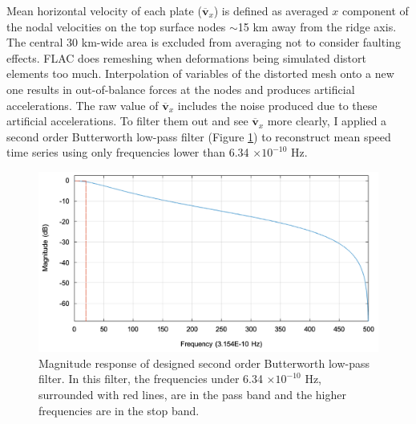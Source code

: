 \documentclass[letterpaper,12pt,notitle]{memphisthesis}                     %
\begin{document}
Mean horizontal velocity of each plate ($\overline{\boldsymbol{v}}_{x}$) is defined as averaged $x$ component of the nodal velocities on the top surface nodes $\sim$15 km away from the ridge axis. The central 30 km-wide area is excluded from averaging not to consider faulting effects. 
FLAC does remeshing \citep{Lavier2002} when deformations being simulated distort elements too much. Interpolation of variables of the distorted mesh onto a new one results in out-of-balance forces at the nodes and produces artificial accelerations. The raw value of $\overline{\boldsymbol{v}}_{x}$ includes the noise produced due to these artificial accelerations. To filter them out and see $\overline{\boldsymbol{v}}_{x}$ more clearly, I applied a second order Butterworth low-pass filter (Figure \ref{fig:filter}) to reconstruct mean speed time series using only frequencies lower than 6.34 $\times 10^{-10}$ Hz.
%
\begin{figure}[!htb]
	\centering
	\includegraphics[width=0.8\linewidth,trim=4 4 4 4,clip]{./figs/filter.png}
	\caption{Magnitude response of designed second order Butterworth low-pass filter. In this filter, the frequencies under 6.34 $\times 10^{-10}$ Hz, surrounded with red lines, are in the pass band and the higher frequencies are in the stop band.}
	\label{fig:filter}
\end{figure}
\end{document}
